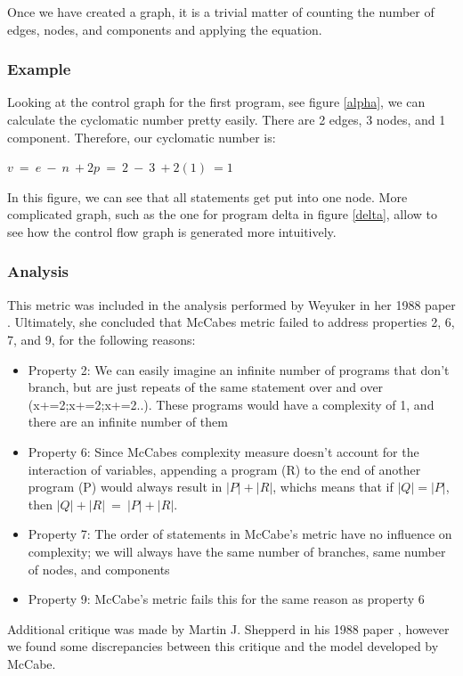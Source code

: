 \documentclass[]{article}
\begin{document}
Once we have created a graph, it is a trivial matter of counting the number of edges, nodes, and components and applying the equation.

\subsubsection{Example}

Looking at the control graph for the first program, see figure \ref{alpha}, we can calculate the cyclomatic number pretty easily.
There are 2 edges, 3 nodes, and 1 component.
Therefore, our cyclomatic number is:

$v ~= ~e ~- ~n ~+ 2p ~= ~2 ~- ~3 ~+ 2(1) ~= 1$

In this figure, we can see that all statements get put into one node.
More complicated graph, such as the one for program delta in figure \ref{delta}, allow to see how the control flow graph is generated more intuitively.

\subsubsection{Analysis}

This metric was included in the analysis performed by Weyuker in her 1988 paper \cite{ref:evaluating_software_complexity_measures}.
Ultimately, she concluded that McCabes metric failed to address properties 2, 6, 7, and 9, for the following reasons:
\begin{itemize}
	\item Property 2: We can easily imagine an infinite number of programs that don't branch, but are just repeats of the same statement over and over (x+=2;x+=2;x+=2..). These programs would have a complexity of 1, and there are an infinite number of them
	\item Property 6: Since McCabes complexity measure doesn't account for the interaction of variables, appending a program (R) to the end of another program (P) would always result in $|P|+|R|$, whichs means that if $|Q|=|P|$, then $|Q|+|R| ~= ~|P|+|R|$.
	\item Property 7: The order of statements in McCabe's metric have no influence on complexity; we will always have the same number of branches, same number of nodes, and components
	\item Property 9: McCabe's metric fails this for the same reason as property 6
\end{itemize}

Additional critique was made by Martin J. Shepperd in his 1988 paper \cite{shepperd1988critique}, however we found some discrepancies between this critique and the model developed by McCabe.
\end{document}

